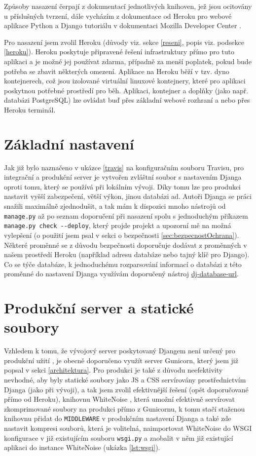     Způsoby nasazení čerpají z dokumentací jednotlivých knihoven, jež jsou ocitovány u příslušných tvrzení, dále vycházím z dokumentace od Heroku pro webové aplikace Python \cite{heroku-python} a Django tutoriálu v dokumentaci Mozilla Developer Center \cite{mdn-django}.
    
    Pro nasazení jsem zvolil Heroku (důvody viz. sekce \ref{reseni}, popis viz. podsekce \ref{heroku}). Heroku poskytuje připravené řešení infrastruktury přímo pro tuto aplikaci a je možné jej používat zdarma, případně za menší poplatek, pokud bude potřeba se zbavit některých omezení. Aplikace na Heroku běží v tzv. dyno kontejnerech, což jsou izolované virtuální linuxové kontejnery, které pro aplikaci poskytnou potřebné prostředí pro běh. Aplikaci, kontejner a doplňky (jako např. databázi PostgreSQL) lze ovládat buď přes základní webové rozhraní a nebo přes Heroku terminál.
    
    \section{Základní nastavení}\label{sec:zakladniNastaveni}
    Jak již bylo naznačeno v ukázce \ref{travis} na konfiguračním souboru Travisu, pro integrační a produkční server je vytvořen zvláštní soubor s nastavením Djanga oproti tomu, který se používá při lokálním vývoji. Díky tomu lze pro produkci nastavit vyšší zabezpečení, větší výkon, jinou databázi ad. Autoři Djanga se práci snažili maximálně zjednodušit, a tak mám k dispozici mnoho nástrojů od \verb|manage.py| až po seznam doporučení při nasazení \cite{django-checklist} spolu s jednoduchým příkazem \verb|manage.py check --deploy|, který projde projekt a upozorní mě na možná vylepšení (o použití jsem psal v sekci o bezpečnosti \ref{sec:bezpecnostOchrana}). Některé proměnné se z důvodu bezpečnosti doporučuje dodávat z proměnných v našem prostředí Heroku (například adresu databáze nebo tajný klíč pro Django). Co se týče databáze, k jednoduchému rozparsování informací o databázi z této proměnné do nastavení Djanga využívám doporučený nástroj \href{https://github.com/kennethreitz/dj-database-url}{dj-database-url}.
    
    \section{Produkční server a statické soubory}
    Vzhledem k tomu, že vývojový server poskytovaný Djangem není určený pro produkční užití \cite{django-managepy}, je obecně doporučeno využít server Gunicorn, který jsem již popsal v sekci \ref{architektura}. Pro produkci je také z důvodu neefektivity nevhodné, aby byly statické soubory jako JS a CSS servírovány prostřednictvím Djanga (jako při vývoji), a tak jsem zvolil efektivnější řešení (opět doporučované přímo od Heroku), knihovnu WhiteNoise \cite{whitenoise}, která umožní efektivně servírovat zkomprimované soubory na produkci přímo z Gunicornu, k tomu stačí staženou knihovnu přidat do \verb|MIDDLEWARE| v produkčním nastavení Djanga a také zde nastavit kompresi souborů, která je volitelná, naimportovat WhiteNoise do WSGI konfigurace v již existujícím souboru \verb|wsgi.py| a zaobalit v něm již existující aplikaci do instance WhiteNoise (ukázka \ref{lst:wsgi}).
    
